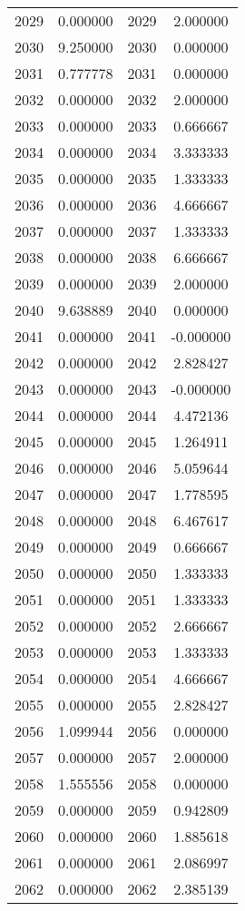 \documentclass[12pt]{article}
\begin{document}
\begin{longtable}{@{}cccc@{}}
2029 & 0.000000 & 2029 & 2.000000 \\
2030 & 9.250000 & 2030 & 0.000000 \\
2031 & 0.777778 & 2031 & 0.000000 \\
2032 & 0.000000 & 2032 & 2.000000 \\
2033 & 0.000000 & 2033 & 0.666667 \\
2034 & 0.000000 & 2034 & 3.333333 \\
2035 & 0.000000 & 2035 & 1.333333 \\
2036 & 0.000000 & 2036 & 4.666667 \\
2037 & 0.000000 & 2037 & 1.333333 \\
2038 & 0.000000 & 2038 & 6.666667 \\
2039 & 0.000000 & 2039 & 2.000000 \\
2040 & 9.638889 & 2040 & 0.000000 \\
2041 & 0.000000 & 2041 & -0.000000 \\
2042 & 0.000000 & 2042 & 2.828427 \\
2043 & 0.000000 & 2043 & -0.000000 \\
2044 & 0.000000 & 2044 & 4.472136 \\
2045 & 0.000000 & 2045 & 1.264911 \\
2046 & 0.000000 & 2046 & 5.059644 \\
2047 & 0.000000 & 2047 & 1.778595 \\
2048 & 0.000000 & 2048 & 6.467617 \\
2049 & 0.000000 & 2049 & 0.666667 \\
2050 & 0.000000 & 2050 & 1.333333 \\
2051 & 0.000000 & 2051 & 1.333333 \\
2052 & 0.000000 & 2052 & 2.666667 \\
2053 & 0.000000 & 2053 & 1.333333 \\
2054 & 0.000000 & 2054 & 4.666667 \\
2055 & 0.000000 & 2055 & 2.828427 \\
2056 & 1.099944 & 2056 & 0.000000 \\
2057 & 0.000000 & 2057 & 2.000000 \\
2058 & 1.555556 & 2058 & 0.000000 \\
2059 & 0.000000 & 2059 & 0.942809 \\
2060 & 0.000000 & 2060 & 1.885618 \\
2061 & 0.000000 & 2061 & 2.086997 \\
2062 & 0.000000 & 2062 & 2.385139 \\

\end{longtable}
\end{document}

